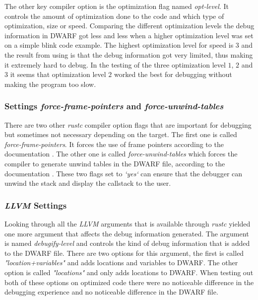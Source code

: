 The other key compiler option is the optimization flag named \emph{opt-level}.
It controls the amount of optimization done to the code and which type of optimization, size or speed.
Comparing the different optimization levels the debug information in \gls{DWARF} got less and less when a higher optimization level was set on a simple blink code example.
The highest optimization level for speed is $3$ and the result from using is that the debug information got very limited, thus making it extremely hard to debug.
In the testing of the three optimization level $1$, $2$ and $3$ it seems that optimization level $2$ worked the best for debugging without making the program too slow.


\subsubsection{Settings \emph{force-frame-pointers} and \emph{force-unwind-tables}}
There are two other \emph{rustc} compiler option flags that are important for debugging but sometimes not necessary depending on the target.
The first one is called \emph{force-frame-pointers}. 
It forces the use of frame pointers according to the documentation \cite{rustc-book-codegen}.
The other one is called \emph{force-unwind-tables} which forces the compiler to generate unwind tables in the \gls{DWARF} file, according to the documentation \cite{rustc-book-codegen}.
These two flags set to \emph{`yes`} can ensure that the debugger can unwind the stack and display the callstack to the user.


\subsubsection{\emph{LLVM} Settings}
Looking through all the \emph{LLVM} arguments that is available through \emph{rustc} yielded one more argument that affects the debug information generated.
The argument is named \emph{debugify-level} and controls the kind of debug information that is added to the \gls{DWARF} file.
There are two options for this argument, the first is called \emph{"location+variables"} and adds locations and variables to \gls{DWARF}.
The other option is called \emph{"locations"} and only adds locations to \gls{DWARF}.
When testing out both of these options on optimized code there were no noticeable difference in the debugging experience and no noticeable difference in the  \gls{DWARF} file.



